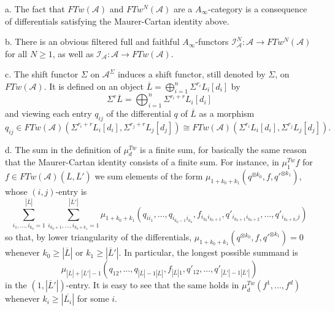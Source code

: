 \begin{rem}\label{finitenesssum} 
a. The fact that $FTw(\mathcal{A})$ and $FTw^N(\mathcal{A})$ are a $A_\infty$-category is a consequence of differentials satisfying the Maurer-Cartan identity above.

b. There is an obvious filtered full and faithful $A_\infty$-functors $\mathcal{I}^N_\mathcal{A}\colon \mathcal{A}\to FTw^N(\mathcal{A})$ for all $N\geq 1$, as well as $\mathcal{I}_\mathcal{A}\colon \mathcal{A}\to FTw(\mathcal{A})$.

c. The shift functor $\Sigma$ on $\mathcal{A}^\Sigma$ induces a shift functor, still denoted by $\Sigma$, on $FTw(\mathcal{A})$. It is defined on an object $\overline{L}= \bigoplus_{i=1}^n \Sigma^{r_i}L_i[d_i]$ by $$\Sigma^r\overline{L} = \bigoplus_{i=1}^n \Sigma^{r_i+r}L_i[d_i]$$ and viewing each entry $q_{ij}$ of the differential $q$ of $\overline{L}$ as a morphism $$q_{ij}\in FTw(\mathcal{A})(\Sigma^{r_i+r}L_i[d_i], \Sigma^{r_j+r}L_j[d_j])\cong FTw(\mathcal{A})(\Sigma^{r_i}L_i[d_i], \Sigma^{r_j}L_j[d_j]).$$

d. The sum in the definition of $\mu_d^{Tw}$ is a finite sum, for basically the same reason that the Maurer-Cartan identity consists of a finite sum. For instance, in $\mu_1^{Tw}f$ for $f\in FTw(\mathcal{A})(\overline{L},\overline{L}')$ we sum elements of the form $\mu_{1+k_0+k_1}(q^{\otimes k_0},f,q'^{\otimes k_1})$, whose $(i,j)$-entry is $$\sum_{i_1,\ldots, i_{k_0}=1}^{|\overline{L}|}\sum_{i_{k_0+1},\ldots, i_{k_0+k_1}=1}^{|\overline{L}'|}\mu_{1+k_0+k_1}\left(q_{ii_1},\ldots, q_{i_{k_0-1}i_{k_0}},f_{i_{k_0}i_{k_0+1}},q'_{i_{k_0+1}i_{k_0+2}},\ldots, q'_{i_{k_0+k_1}j}\right)$$ so that, by lower triangularity of the differentials, $\mu_{1+k_0+k_1}(q^{\otimes k_0},f,q'^{\otimes k_1})=0$ whenever $k_0\geq |\overline{L}|$ or $k_1\geq |\overline{L}'|$. In particular, the longest possible summand is $$\mu_{|\overline{L}|+|\overline{L}'|-1}\left(q_{12},\ldots, q_{|\overline{L}|-1|\overline{L}|},f_{|\overline{L}|1},q'_{12},\ldots, q'_{|\overline{L}'|-1|\overline{L}'|}\right)$$ in the $(1,|\overline{L}'|)$-entry. It is easy to see that the same holds in $\mu_d^{Tw}(f^1,\ldots, f^d)$ whenever $k_i\geq |\overline{L_i}|$ for some $i$.

\end{rem}


